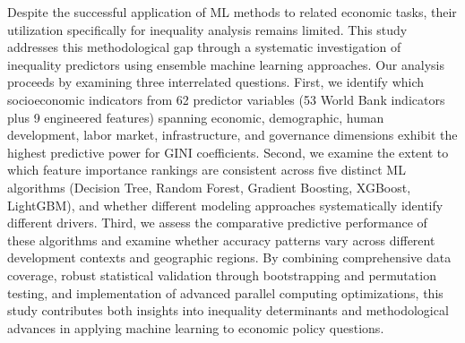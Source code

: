 \documentclass[10pt,twocolumn]{article}
\begin{document}
\par Despite the successful application of ML methods to related economic tasks, their utilization specifically for inequality analysis remains limited. This study addresses this methodological gap through a systematic investigation of inequality predictors using ensemble machine learning approaches. Our analysis proceeds by examining three interrelated questions. First, we identify which socioeconomic indicators from 62 predictor variables (53 World Bank indicators plus 9 engineered features) spanning economic, demographic, human development, labor market, infrastructure, and governance dimensions exhibit the highest predictive power for GINI coefficients. Second, we examine the extent to which feature importance rankings are consistent across five distinct ML algorithms (Decision Tree, Random Forest, Gradient Boosting, XGBoost, LightGBM), and whether different modeling approaches systematically identify different drivers. Third, we assess the comparative predictive performance of these algorithms and examine whether accuracy patterns vary across different development contexts and geographic regions. By combining comprehensive data coverage, robust statistical validation through bootstrapping and permutation testing, and implementation of advanced parallel computing optimizations, this study contributes both insights into inequality determinants and methodological advances in applying machine learning to economic policy questions.
\end{document}
